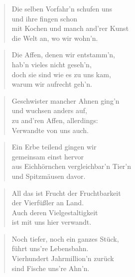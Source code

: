 \documentclass[10pt,a4paper]{article}
\begin{document}
\begin{multicols}{2}
\begin{verse}
Die selben Vorfahr’n schufen uns \\
und ihre fingen schon \\
mit Kochen und manch and’rer Kunst \\
die Welt an, wo wir wohn’n. \\
\end{verse}

\begin{verse}
Die Affen, denen wir entstamm’n, \\
hab’n vieles nicht geseh’n, \\
doch sie sind wie es zu uns kam, \\
warum wir aufrecht geh’n. \\
\end{verse}

\begin{verse}
Geschwister mancher Ahnen ging’n \\
und wuchsen anders auf, \\
zu and’ren Affen, allerdings: \\
Verwandte von uns auch. \\
\end{verse}

\begin{verse}
Ein Erbe teilend gingen wir \\
gemeinsam einst hervor \\
aus Eichhörnchen vergleichbar’n Tier’n \\
und Spitzmäusen davor. \\
\end{verse}

\begin{verse}
All das ist Frucht der Fruchtbarkeit \\
der Vierfüßler an Land. \\
Auch deren Vielgestaltigkeit \\
ist mit uns hier verwandt. \\
\end{verse}

\begin{verse}
Noch tiefer, noch ein ganzes Stück, \\
führt uns’re Lebensbahn. \\
Vierhundert Jahrmillion’n zurück \\
sind Fische uns’re Ahn’n. \\
\end{verse}


\end{multicols}
\end{document}
